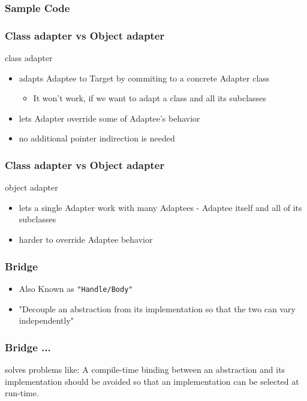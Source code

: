 \documentclass{beamer}
\begin{document}
\begin{frame}[fragile]
\frametitle{Sample Code}
    
\end{frame}

\begin{frame}[fragile]
\frametitle{Class adapter vs Object adapter}
\begin{block}{class adapter}
    \begin{itemize}
    \item adapts Adaptee to Target by commiting to a concrete Adapter class
         \begin{itemize}
            \item It won't work, if we want to adapt a class and all its subclasses 
        \end{itemize}
     \item lets Adapter override some of Adaptee's behavior
     \item no additional pointer indirection is needed
    \end{itemize}
\end{block}

\end{frame}

\begin{frame}[fragile]
\frametitle{Class adapter vs Object adapter}
\begin{block}{object adapter}
    \begin{itemize}
    \item lets a single Adapter work with many Adaptees - Adaptee itself and all of its subclasses
     \item harder to override Adaptee behavior
    \end{itemize}
\end{block}

\end{frame}


\begin{frame}[fragile]
\frametitle{Bridge}

\begin{itemize}
\item Also Known as \texttt{"Handle/Body"}
\item "Decouple an abstraction from its implementation so that the two can vary independently"
\end{itemize}

\end{frame}

\begin{frame}[fragile]
\frametitle{Bridge ...}

\begin{block}{solves problems like:}
    A compile-time binding between an abstraction and its implementation should be 
    avoided so that an implementation can be selected at run-time.
\end{block}

\end{frame}
\end{document}
